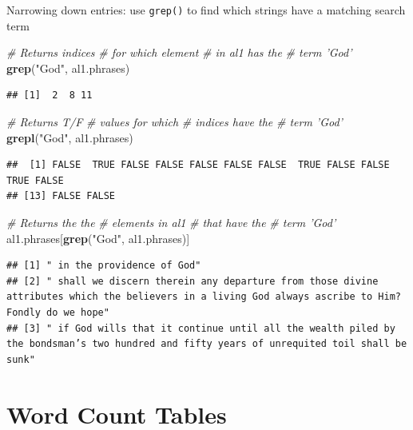\documentclass[
]{book}
\newenvironment{Shaded}{\begin{snugshade}}{\end{snugshade}}
\newcommand{\CommentTok}[1]{\textcolor[rgb]{0.56,0.35,0.01}{\textit{#1}}}
\newcommand{\KeywordTok}[1]{\textcolor[rgb]{0.13,0.29,0.53}{\textbf{#1}}}
\newcommand{\NormalTok}[1]{#1}
\newcommand{\StringTok}[1]{\textcolor[rgb]{0.31,0.60,0.02}{#1}}
\begin{document}
Narrowing down entries: use \texttt{grep()} to find which strings have a matching search term

\begin{Shaded}
\begin{Highlighting}[]
\CommentTok{# Returns indices}
\CommentTok{# for which element}
\CommentTok{# in al1 has the}
\CommentTok{# term 'God'}
\KeywordTok{grep}\NormalTok{(}\StringTok{"God"}\NormalTok{, al1.phrases)}
\end{Highlighting}
\end{Shaded}

\begin{verbatim}
## [1]  2  8 11
\end{verbatim}

\begin{Shaded}
\begin{Highlighting}[]
\CommentTok{# Returns T/F}
\CommentTok{# values for which}
\CommentTok{# indices have the}
\CommentTok{# term 'God'}
\KeywordTok{grepl}\NormalTok{(}\StringTok{"God"}\NormalTok{, al1.phrases)}
\end{Highlighting}
\end{Shaded}

\begin{verbatim}
##  [1] FALSE  TRUE FALSE FALSE FALSE FALSE FALSE  TRUE FALSE FALSE  TRUE FALSE
## [13] FALSE FALSE
\end{verbatim}

\begin{Shaded}
\begin{Highlighting}[]
\CommentTok{# Returns the the}
\CommentTok{# elements in al1}
\CommentTok{# that have the}
\CommentTok{# term 'God'}
\NormalTok{al1.phrases[}\KeywordTok{grep}\NormalTok{(}\StringTok{"God"}\NormalTok{,}
\NormalTok{    al1.phrases)]}
\end{Highlighting}
\end{Shaded}

\begin{verbatim}
## [1] " in the providence of God"                                                                                                                        
## [2] " shall we discern therein any departure from those divine attributes which the believers in a living God always ascribe to Him? Fondly do we hope"
## [3] " if God wills that it continue until all the wealth piled by the bondsman’s two hundred and fifty years of unrequited toil shall be sunk"
\end{verbatim}

\hypertarget{word-count-tables}{%
\section{Word Count Tables}\label{word-count-tables}}
\end{document}
